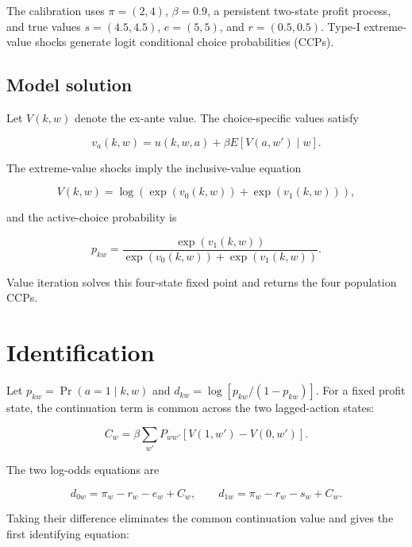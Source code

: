 \documentclass[10pt]{article}
\begin{document}
The calibration uses $\pi=(2,4)$, $\beta=0.9$, a persistent two-state profit process, and true values $s=(4.5,4.5)$, $e=(5,5)$, and $r=(0.5,0.5)$. Type-I extreme-value shocks generate logit conditional choice probabilities (CCPs).

\subsection{Model solution}

Let $V(k,w)$ denote the ex-ante value. The choice-specific values satisfy

\begin{equation*}
v_a(k,w)=u(k,w,a)+\beta E[V(a,w')\mid w].
\end{equation*}

The extreme-value shocks imply the inclusive-value equation

\begin{equation*}
V(k,w)=\log\!\left(\exp(v_0(k,w))+\exp(v_1(k,w))\right),
\end{equation*}

and the active-choice probability is

\begin{equation*}
p_{kw}=\frac{\exp(v_1(k,w))}
{\exp(v_0(k,w))+\exp(v_1(k,w))}.
\end{equation*}

Value iteration solves this four-state fixed point and returns the four population CCPs.

\section{Identification}

Let $p_{kw}=\Pr(a=1\mid k,w)$ and $d_{kw}=\log[p_{kw}/(1-p_{kw})]$. For a fixed profit state, the continuation term is common across the two lagged-action states:

\begin{equation*}
C_w=\beta\sum_{w'}P_{ww'}[V(1,w')-V(0,w')].
\end{equation*}

The two log-odds equations are

\begin{equation*}
d_{0w}=\pi_w-r_w-e_w+C_w,
\qquad
d_{1w}=\pi_w-r_w-s_w+C_w.
\end{equation*}

Taking their difference eliminates the common continuation value and gives the first identifying equation:
\end{document}
